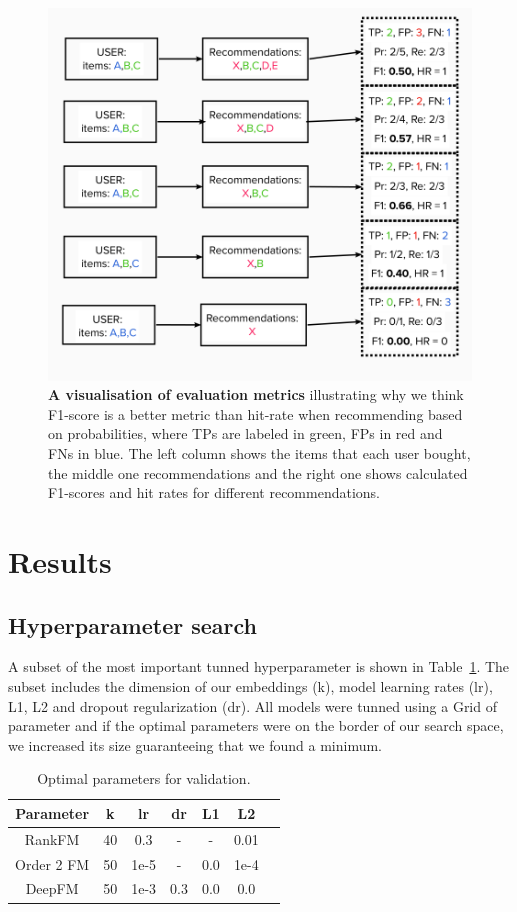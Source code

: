 \documentclass[fleqn,moreauthors,10pt]{ds_report}
\begin{document}
\begin{figure}[H]\centering
	\includegraphics[width=0.9\linewidth]{example.png}
	\caption{\textbf{A visualisation of evaluation metrics} illustrating why we think F1-score is a better metric than hit-rate when recommending based on probabilities, where TPs are labeled in green, FPs in red and FNs in blue. The left column shows the items that each user bought, the middle one recommendations and the right one shows calculated F1-scores and hit rates for different recommendations.} 
	\label{4}
\end{figure}

\section*{Results}

\subsection*{Hyperparameter search}
A subset of the most important tunned hyperparameter is shown in Table~\ref{tab:hyper-corr}.
The subset includes the dimension of our embeddings (k), model learning rates (lr), L1, L2 and dropout regularization (dr).
All models were tunned using a Grid of parameter and if the optimal parameters were on the border of our search space, we increased its size guaranteeing that we found a minimum.
\begin{table}[hbt]
    \centering
    \begin{tabular}{c|c|c|c|c|c|c}
        Parameter & k & lr & dr & L1 & L2 \\
        \hline
        RankFM & 40 & 0.3 & - & - & 0.01 \\
        Order 2 FM & 50 & 1e-5 & - & 0.0 & 1e-4\\
        DeepFM & 50 & 1e-3 & 0.3 & 0.0 & 0.0\\
    \end{tabular}
    \caption{Optimal parameters for validation.}
    \label{tab:hyper-corr}
\end{table}
\end{document}
